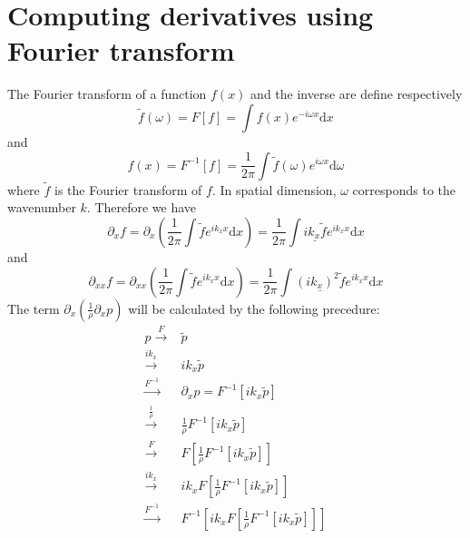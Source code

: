 \section{Computing derivatives using Fourier transform}

The Fourier transform of a function $f(x)$ and the inverse are define respectively
\begin{equation}
 \tilde{f}(\omega)=F[f]=\int f(x)e^{-i\omega x}\mathrm{d}x
\end{equation}
and 
\begin{equation}
 f(x)=F^{-1}[f]=\frac{1}{2\pi}\int \tilde{f}(\omega)e^{i\omega x}\mathrm{d}\omega
\end{equation} 
where $\tilde{f}$ is the Fourier transform of $f$. In spatial dimension, $\omega$ corresponds to the wavenumber $k$. Therefore we have
\begin{equation}
 \partial_x f=\partial_x\left( \frac{1}{2\pi}\int \tilde{f}e^{ik_x x}\mathrm{d}x\right)
= \frac{1}{2\pi}\int \underline{ik_x\tilde{f}}e^{ik_x x}\mathrm{d}x
\end{equation}
and 
\begin{equation}
 \partial_{xx} f=\partial_{xx}\left( \frac{1}{2\pi}\int \tilde{f}e^{ik_x x}\mathrm{d}x\right)
= \frac{1}{2\pi}\int \underline{(ik_x)^2\tilde{f}}e^{ik_x x}\mathrm{d}x
\end{equation}
The term $\partial_x\left(\frac{1}{\rho}\partial_x p\right)$ will be calculated by the following precedure:
\begin{equation}
\begin{array}{rl}
 p\stackrel{F}{\longrightarrow}& \tilde{p}\\
 \stackrel{ik_x}{\longrightarrow} &ik_x\tilde{p}\\
 \stackrel{F^{-1}}{\longrightarrow} &\partial_x p= F^{-1}[ik_x\tilde{p}]\\
 \stackrel{\frac{1}{\rho}}{\rightarrow} &\frac{1}{\rho}F^{-1}[ik_x\tilde{p}]\\
 \stackrel{F}{\rightarrow} & F[\frac{1}{\rho}F^{-1}[ik_x\tilde{p}]]\\
 \stackrel{ik_x}{\rightarrow} & ik_xF[\frac{1}{\rho}F^{-1}[ik_x\tilde{p}]]\\
 \stackrel{F^{-1}}{\rightarrow}& F^{-1}[ik_xF[\frac{1}{\rho}F^{-1}[ik_x\tilde{p}]]] \\
\end{array}
\end{equation}

